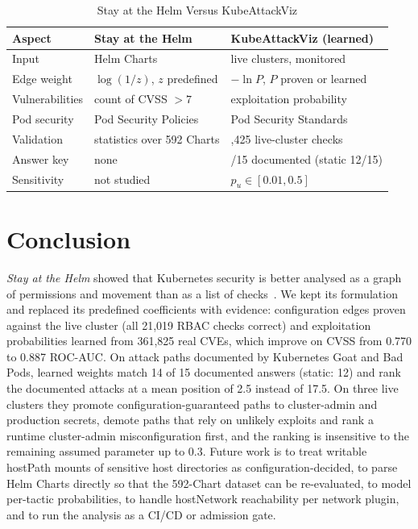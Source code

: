 \documentclass[conference]{IEEEtran}
\begin{document}
\begin{table}[H]
\caption{Stay at the Helm Versus KubeAttackViz}
\label{tab:summary}
\centering
\footnotesize
\begin{tabular}{@{}>{\raggedright}p{}>{\raggedright}p{}>{\raggedright\arraybackslash}p{}@{}}
\toprule
Aspect & Stay at the Helm~\cite{blaise2022} & KubeAttackViz (learned) \\
\midrule
Input & Helm Charts & live clusters, monitored \\
Edge weight & $\log(1/z)$, $z$ predefined & $-\ln P$, $P$ proven or learned \\
Vulnerabilities & count of CVSS $>7$ & exploitation probability \\
Pod security & Pod Security Policies & Pod Security Standards \\
Validation & statistics over 592 Charts & 22,425 live-cluster checks \\
Answer key & none & 14/15 documented (static 12/15) \\
Sensitivity & not studied & $p_u\in[0.01,0.5]$ \\
\bottomrule
\end{tabular}
\end{table}

\section{Conclusion}
\emph{Stay at the Helm} showed that Kubernetes security is better analysed as a graph of permissions and movement than as a list of
checks~\cite{blaise2022}. We kept its formulation and replaced its predefined coefficients with evidence: configuration edges
proven against the live cluster (all 21,019 RBAC checks correct) and exploitation probabilities learned from 361,825 real CVEs,
which improve on CVSS from 0.770 to 0.887 ROC-AUC. On attack paths documented by Kubernetes Goat and Bad Pods, learned weights match
14 of 15 documented answers (static: 12) and rank the documented attacks at a mean position of 2.5 instead of 17.5. On three live
clusters they promote configuration-guaranteed paths to cluster-admin and production secrets, demote paths that rely on unlikely
exploits and rank a runtime cluster-admin misconfiguration first, and the ranking is insensitive to the remaining assumed
parameter up to 0.3. Future work is to treat writable hostPath mounts of sensitive host directories as configuration-decided, to
parse Helm Charts directly so that the 592-Chart dataset can be re-evaluated, to model per-tactic probabilities, to handle hostNetwork reachability per network plugin, and to run the analysis
as a CI/CD or admission gate.
\end{document}
